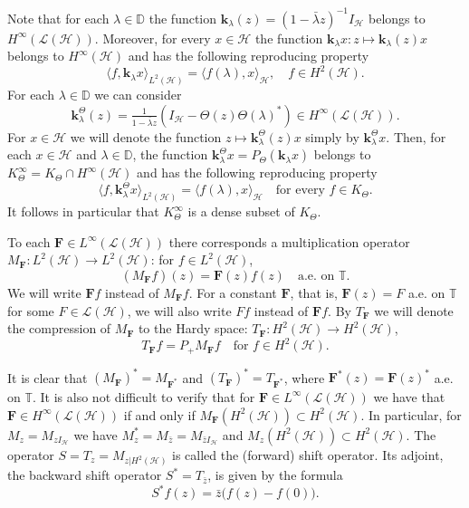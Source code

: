 \documentclass[12pt]{amsart}
\numberwithin{equation}{section}
\newcommand{\hsp}{\mathcal{H}}
\newcommand{\oL }{\mathcal{L}(\hsp) }
\newcommand{\ke}{{\mathbf{k}}}
\newcommand{\F}{{\mathbf{F}}}
\newcommand{\z}{{z}}
\theoremstyle{definition}
\numberwithin{equation}{section}
\begin{document}
Note that for each $\lambda\in \mathbb{D}$ the function $\ke_\lambda(z)= (1-\bar{\lambda}z)^{-1}I_{\hsp}$ belongs to $H^{\infty}(\oL )$. Moreover, for every $x\in\hsp$ the function $\ke_\lambda x:z\mapsto \ke_\lambda(z)x$ belongs to $H^{\infty}(\hsp)$ and has the following reproducing property
$$\langle f, \ke_\lambda x\rangle_{L^2(\hsp)}=\langle f(\lambda),x\rangle_{\hsp}, \quad f\in H^2(\hsp).$$
For each $\lambda\in\mathbb{D}$ we can consider
$$\ke_{\lambda}^{\Theta}(z)=\tfrac1{1-\bar\lambda z}(I_\hsp-\Theta(z)\Theta(\lambda)^*)\in H^{\infty}(\oL).$$
For $x\in\hsp$ we will denote the function $z\mapsto \ke_{\lambda}^{\Theta}(z)x$ simply by $\ke_{\lambda}^{\Theta}x$. Then, for each $x\in\hsp$ and $\lambda\in\mathbb{D}$, the function $\ke_{\lambda}^{\Theta}x=P_{\Theta}(\ke_{\lambda}x)$  belongs to $K_{\Theta}^{\infty}=K_{\Theta}\cap H^{\infty}(\hsp )$ and has the following reproducing property
$$\langle f, \ke_{\lambda}^{\Theta}x\rangle_{L^2(\hsp)}=\langle f(\lambda), x\rangle_\hsp\quad\text{for every }f\in K_{\Theta}.$$
It follows in particular that $K_{\Theta}^{\infty}$ is a dense subset of $K_{\Theta}$.




To each $\F\in L^\infty(\oL)$ there corresponds a multiplication operator $M_\F:L^2(\hsp)\to L^2(\hsp)$: for $f\in L^2(\hsp)$,
$$(M_\F f)(\z)=\F(\z)f(\z)\quad \text{a.e. on }\mathbb{T}.$$
We will write $\F f$ instead of $M_\F f$. For a constant $\F$, that is, $\F(z)=F$ a.e. on $\mathbb{T}$ for some $F\in\oL$, we will also write $Ff$ instead of $\F f$. By $T_{\F}$ we will denote the compression of $M_{\F}$ to the Hardy space: $T_{\F}:H^2(\hsp)\to H^2(\hsp)$, $$T_{\F}f=P_+M_{\F}f\quad\text{for }f\in H^2(\hsp).$$

It is clear that $(M_\F)^*=M_{\F^*}$ and $(T_\F)^*=T_{\F^*}$, where $\F^*(\z)=\F(\z)^*$ a.e. on $\mathbb{T}$. It is also not difficult to verify that for $\F\in L^{\infty}(\oL)$ we have that $\F\in H^{\infty}(\oL)$ if and only if $M_{\F}(H^2(\hsp))\subset H^2(\hsp)$. In particular, for $M_z=M_{zI_\hsp}$ we have $M_z^*=M_{\bar{z}}=M_{\bar{z}I_\hsp}$ and $M_z(H^2(\hsp))\subset H^2(\hsp)$. The operator $S=T_z=M_{z|H^2(\hsp)}$ is called the (forward) shift operator. Its adjoint, the backward shift operator $S^*=T_{\bar z}$, is given by the formula
$$S^*f(z)=\bar z\big(f(z)-f(0)\big).$$
\end{document}

